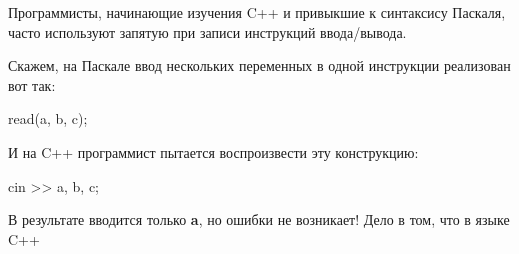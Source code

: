 \begin{typerror}
	\label{TE_cin-cout-comma}

	Программисты, начинающие изучения C++ и привыкшие к синтаксису Паскаля,
	часто используют запятую при записи инструкций ввода/вывода.
	
	Скажем, на Паскале ввод нескольких переменных в одной инструкции реализован вот так:
	
	read(a, b, c);
	
	И на C++ программист пытается воспроизвести эту конструкцию:
	
	cin >> a, b, c;
	
	В результате вводится только \textbf{a}, но ошибки не возникает!
	Дело в том, что в языке C++

\end{typerror}

